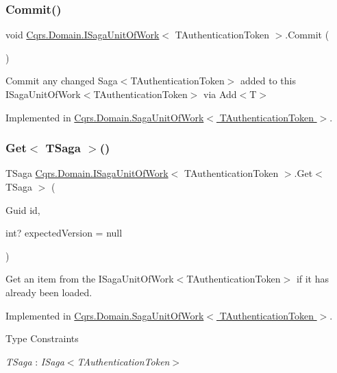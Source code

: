 \subsubsection{\texorpdfstring{Commit()}{Commit()}}
{\footnotesize\ttfamily void \hyperlink{interfaceCqrs_1_1Domain_1_1ISagaUnitOfWork}{Cqrs.\+Domain.\+I\+Saga\+Unit\+Of\+Work}$<$ T\+Authentication\+Token $>$.Commit (\begin{DoxyParamCaption}{ }\end{DoxyParamCaption})}



Commit any changed Saga$<$\+T\+Authentication\+Token$>$ added to this I\+Saga\+Unit\+Of\+Work$<$\+T\+Authentication\+Token$>$ via Add$<$\+T$>$ 



Implemented in \hyperlink{classCqrs_1_1Domain_1_1SagaUnitOfWork_aed2756dadfe0a0903a791944d02c4db8_aed2756dadfe0a0903a791944d02c4db8}{Cqrs.\+Domain.\+Saga\+Unit\+Of\+Work$<$ T\+Authentication\+Token $>$}.

\mbox{\label{interfaceCqrs_1_1Domain_1_1ISagaUnitOfWork_a4c4745fcebc42ba5c94647b22939809b_a4c4745fcebc42ba5c94647b22939809b}} 
\subsubsection{\texorpdfstring{Get$<$ T\+Saga $>$()}{Get< TSaga >()}}
{\footnotesize\ttfamily T\+Saga \hyperlink{interfaceCqrs_1_1Domain_1_1ISagaUnitOfWork}{Cqrs.\+Domain.\+I\+Saga\+Unit\+Of\+Work}$<$ T\+Authentication\+Token $>$.Get$<$ T\+Saga $>$ (\begin{DoxyParamCaption}\item[{Guid}]{id,  }\item[{int?}]{expected\+Version = {\ttfamily null} }\end{DoxyParamCaption})}



Get an item from the I\+Saga\+Unit\+Of\+Work$<$\+T\+Authentication\+Token$>$ if it has already been loaded. 



Implemented in \hyperlink{classCqrs_1_1Domain_1_1SagaUnitOfWork_acebe159e3b27e36a91909e97cf37d28d_acebe159e3b27e36a91909e97cf37d28d}{Cqrs.\+Domain.\+Saga\+Unit\+Of\+Work$<$ T\+Authentication\+Token $>$}.

\begin{Desc}
\item[Type Constraints]\begin{description}
\item[{\em T\+Saga} : {\em I\+Saga$<$T\+Authentication\+Token$>$}]\end{description}
\end{Desc}
